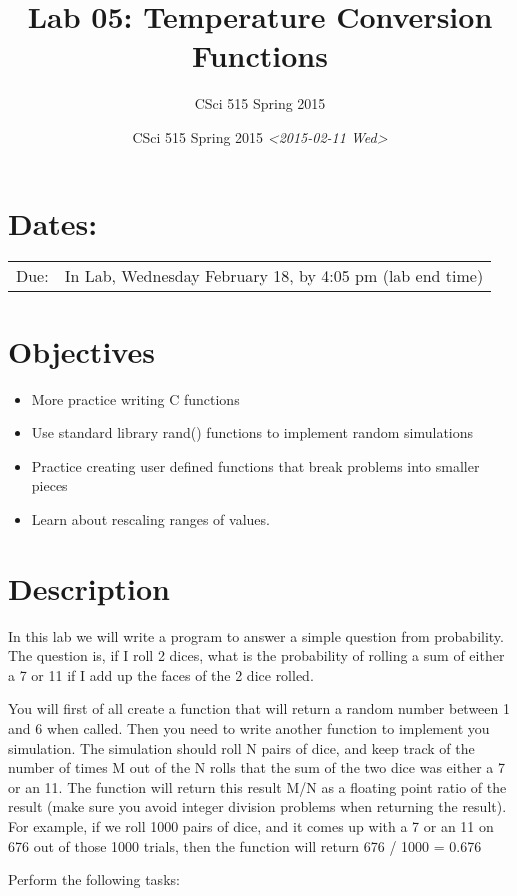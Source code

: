 \documentclass[11pt]{article}
\author{CSci 515 Spring 2015}
\date{CSci 515 Spring 2015 \textit{<2015-02-11 Wed>}}
\title{Lab 05: Temperature Conversion Functions}
\begin{document}
\maketitle

\section*{Dates:}
\label{sec-1}
\begin{center}
\begin{tabular}{ll}
Due: & In Lab, Wednesday February 18, by 4:05 pm (lab end time)\\
\end{tabular}
\end{center}
\section*{Objectives}
\label{sec-2}
\begin{itemize}
\item More practice writing C functions
\item Use standard library rand() functions to implement random simulations
\item Practice creating user defined functions that break problems into smaller pieces
\item Learn about rescaling ranges of values.
\end{itemize}
\section*{Description}
\label{sec-3}
In this lab we will write a program to answer a simple question from
probability.  The question is, if I roll 2 dices, what is the probability
of rolling a sum of either a 7 or 11 if I add up the faces of the 2 dice
rolled.

You will first of all create a function that will return a random
number between 1 and 6 when called.  Then you need to write another
function to implement you simulation.  The simulation should roll N
pairs of dice, and keep track of the number of times M out of the N
rolls that the sum of the two dice was either a 7 or an 11.  The
function will return this result M/N as a floating point ratio of the
result (make sure you avoid integer division problems when returning
the result).  For example, if we roll 1000 pairs of dice, and it comes
up with a 7 or an 11 on 676 out of those 1000 trials, then the
function will return 676 / 1000 = 0.676


Perform the following tasks:
\end{document}
